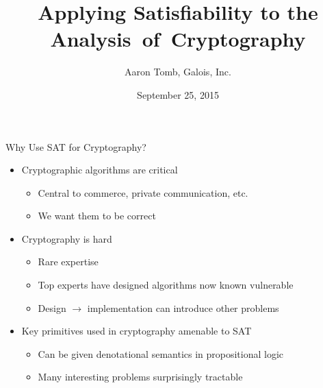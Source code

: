 \documentclass[ignorenonframetext,]{beamer}
\title{Applying Satisfiability to the Analysis~of~Cryptography}
\author{Aaron Tomb, Galois, Inc.}
\date{September 25, 2015}
\providecommand{\tightlist}{%
  \setlength{\itemsep}{0pt}\setlength{\parskip}{0pt}}
\begin{document}
\frame{\titlepage}

\begin{frame}{Why Use SAT for Cryptography?}

\begin{itemize}
\tightlist
\item
  Cryptographic algorithms are critical

  \begin{itemize}
  \tightlist
  \item
    Central to commerce, private communication, etc.
  \item
    We want them to be correct
  \end{itemize}
\item
  Cryptography is hard

  \begin{itemize}
  \tightlist
  \item
    Rare expertise
  \item
    Top experts have designed algorithms now known vulnerable
  \item
    Design \(\rightarrow\) implementation can introduce other problems
  \end{itemize}
\item
  Key primitives used in cryptography amenable to SAT

  \begin{itemize}
  \tightlist
  \item
    Can be given denotational semantics in propositional logic
  \item
    Many interesting problems surprisingly tractable
  \end{itemize}
\end{itemize}

\end{frame}
\end{document}
